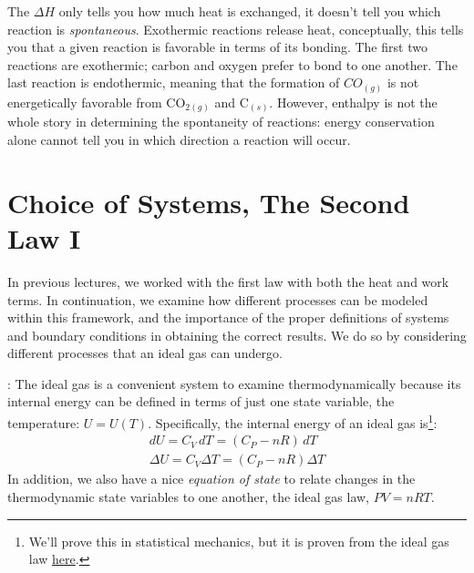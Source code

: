 \documentclass[12pt]{article}
\begin{document}
The $\Delta H$ only tells you how much heat is exchanged, it doesn't tell you which reaction is \emph{spontaneous}. Exothermic reactions release heat, conceptually, this tells you that a given reaction is favorable in terms of its bonding. The first two reactions are exothermic; carbon and oxygen prefer to bond to one another. The last reaction is endothermic, meaning that the formation of $CO_{(g)}$ is not energetically favorable from CO$_{2 (g)}$ and C$_{(s)}$. However, enthalpy is not the whole story in determining the spontaneity of reactions: energy conservation alone cannot tell you in which direction a reaction will occur.

\section{Choice of Systems, The Second Law I}
In previous lectures, we worked with the first law with both the heat and work terms.  In continuation, we examine how different processes can be modeled within this framework, and the importance of the proper definitions of systems and boundary conditions in obtaining the correct results. We do so by considering different processes that an ideal gas can undergo.

:  The ideal gas is a convenient system to examine thermodynamically because its internal energy can be defined in terms of just one state variable, the temperature: $U = U(T)$. Specifically, the internal energy of an ideal gas is\footnote{We'll prove this in statistical mechanics, but it is proven from the ideal gas law \href{http://pruffle.mit.edu/3.00/Lecture_11_web/node1.html}{here}.}:
\begin{align*}
dU=C_V \, dT=(C_P-nR)\, dT\\
\Delta U=C_V \Delta T = (C_P-nR) \Delta T
\end{align*}
In addition, we also have a nice \emph{equation of state} to relate changes in the thermodynamic state variables to one another, the ideal gas law, $PV=nRT$.
\end{document}
